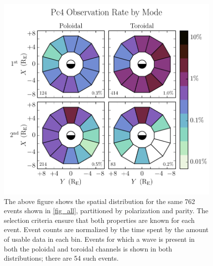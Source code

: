 \documentclass{article}
\begin{document}
\begin{figure}
    \begin{center}
    \includegraphics[width=\textwidth]{figures/fig_mode.pdf}
    \caption{
        The above figure shows the spatial distribution for the same 762 events shown in \cref{fig_all}, partitioned by polarization and parity. The selection criteria ensure that both properties are known for each event. Event counts are normalized by the time spent by the amount of usable data in each bin. Events for which a wave is present in both the poloidal and toroidal channels is shown in both distributions; there are 54 such events.
    }
    \label{fig_mode}
    \end{center}
\end{figure}



\end{document}
